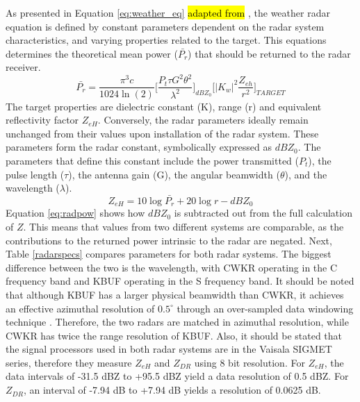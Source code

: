 As presented in Equation \ref{eq:weather_eq} \hl{adapted from} \cite{Rogers1989}, the weather radar equation is defined by constant parameters dependent on the radar system characteristics, and
varying properties related to the target. This equations determines the theoretical mean power ($\bar{P_r}$) that should be returned to the radar receiver.
\begin{equation}\label{eq:weather_eq}
\bar{P_r} = \frac{\pi^3c}{1024 \ln(2)} \Bigg[\frac{P_t \tau G^2 \theta^2}{\lambda^2}\Bigg]_{dBZ_0} \Bigg[|K_{w}|^{2}\frac{Z_{eh}}{r^2}\Bigg]_{TARGET}
\end{equation}
The target properties are dielectric constant (K), range (r) and equivalent reflectivity factor $Z_{eH}$. Conversely, the radar parameters ideally remain
unchanged from their values upon installation of the radar system. These parameters form the radar constant, symbolically expressed as $dBZ_0$. The
parameters that define this constant include the power transmitted ($P_t$), the pulse length ($\tau$), the antenna gain (G), the angular beamwidth
($\theta$), and the wavelength ($\lambda$).
\begin{equation}\label{eq:radpow}
Z_{eH} = 10 \log{\bar{P_r}} + 20 \log r - dBZ_0
\end{equation}
Equation \ref{eq:radpow} shows how $dBZ_0$ is subtracted out from the full calculation of $Z$. This means that values from two different systems are comparable, as the contributions to the returned power intrinsic to the radar are negated. Next, Table \ref{radarspecs} compares parameters for both
radar systems. The biggest difference between the two is the wavelength, with CWKR operating in the C frequency band and KBUF operating in the S frequency
band. It should be noted that although KBUF has a larger physical beamwidth than CWKR, it achieves an effective azimuthal resolution of $0.5^{\circ}$ through
an over-sampled data windowing technique \citep{Torres2007}. Therefore, the two radars are matched in azimuthal resolution, while CWKR has twice the range
resolution of KBUF. Also, it should be stated that the signal processors used in both radar systems are in the
Vaisala SIGMET series, therefore they measure
$Z_{eH}$ and $Z_{DR}$ using 8 bit resolution. For $Z_{eH}$, the data intervals of -31.5 dBZ to +95.5 dBZ yield a
data resolution of 0.5 dBZ.  For $Z_{DR}$, an interval of -7.94 dB to +7.94 dB yields a resolution of 0.0625 dB.

